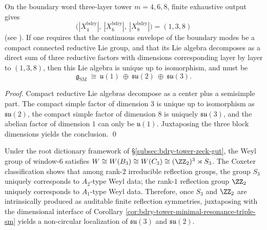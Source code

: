 \begin{corollary}\label{cor:bdry-tower-minimal-resonance-triple-sm}
On the boundary word three-layer tower \(m=4,6,8\), finite exhaustive output gives
\[
\bigl(|X^{\mathrm{bdry}}_4|,\ |X^{\mathrm{bdry}}_6|,\ |X^{\mathrm{bdry}}_8|\bigr)=(1,3,8)
\]
(see \texttt{}).
If one requires that the continuous envelope of the boundary modes be a compact connected reductive Lie group, and that its Lie algebra decomposes as a direct sum of three reductive factors with dimensions corresponding layer by layer to \((1,3,8)\),
then this Lie algebra is unique up to isomorphism, and must be
\[
\mathfrak g_{\mathrm{SM}}\ \cong\ \mathfrak u(1)\ \oplus\ \mathfrak{su}(2)\ \oplus\ \mathfrak{su}(3).
\]
\end{corollary}
\begin{proof}
Compact reductive Lie algebras decompose as a center plus a semisimple part.
The compact simple factor of dimension \(3\) is unique up to isomorphism as \(\mathfrak{su}(2)\), the compact simple factor of dimension \(8\) is uniquely \(\mathfrak{su}(3)\), and the abelian factor of dimension \(1\) can only be \(\mathfrak u(1)\).
Juxtaposing the three block dimensions yields the conclusion. \qed
\end{proof}

\begin{remark}\label{rem:window6-coxeter-weyl-select-su3-su2}
Under the root dictionary framework of \S\ref{subsec:bdry-tower-zeck-gut}, the Weyl group of window-\(6\) satisfies
\(
W\cong W(B_3)\cong W(C_3)\cong (\ZZ_2)^3\rtimes S_3
\).
The Coxeter classification shows that among rank-\(2\) irreducible reflection groups, the group \(S_3\) uniquely corresponds to \(A_2\)-type Weyl data; the rank-\(1\) reflection group \(\ZZ_2\) uniquely corresponds to \(A_1\)-type Weyl data.
Therefore, once \(S_3\) and \(\ZZ_2\) are intrinsically produced as auditable finite reflection symmetries, juxtaposing with the dimensional interface of Corollary \ref{cor:bdry-tower-minimal-resonance-triple-sm} yields a non-circular localization of \(\mathfrak{su}(3)\) and \(\mathfrak{su}(2)\).
\end{remark}

